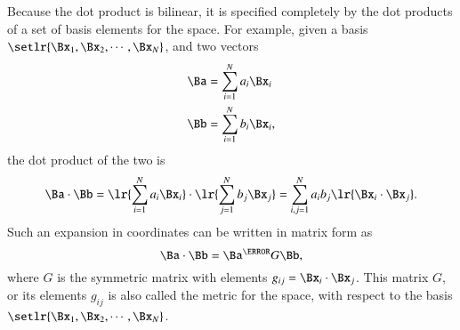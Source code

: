 %
%

Because the dot product is bilinear, it is
specified completely by the dot products of a set of basis elements for the space.
For example,
given a basis \( \setlr{ \Bx_1, \Bx_2, \cdots, \Bx_N} \), and two vectors
\begin{dmath}\label{eqn:prereq_standardbasis:240}
\begin{aligned}
   \Ba &= \sum_{i = 1}^N a_i \Bx_i \\
   \Bb &= \sum_{i = 1}^N b_i \Bx_i,
\end{aligned}
\end{dmath}
the dot product of the two is
\begin{dmath}\label{eqn:prereq_standardbasis:260}
\Ba \cdot \Bb
=
   \lr{ \sum_{i = 1}^N a_i \Bx_i } \cdot
   \lr{ \sum_{j = 1}^N b_j \Bx_j }
=
   \sum_{i,j = 1}^N a_i b_j \lr{ \Bx_i \cdot \Bx_j }.
\end{dmath}
Such an expansion in coordinates can be written in matrix form as
\begin{dmath}\label{eqn:prereq_standardbasis:280}
\Ba \cdot \Bb
=
\Ba^\T G \Bb,
\end{dmath}
where \( G \) is the symmetric matrix with elements \( g_{ij} = \Bx_i \cdot \Bx_j \).
This matrix \( G \), or its elements \( g_{ij} \) is also called the metric for the space, with respect to the basis \( \setlr{ \Bx_1, \Bx_2, \cdots, \Bx_N} \).

